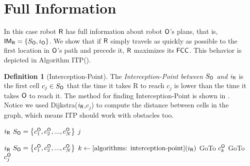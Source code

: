 \documentclass[letterpaper, 10 pt, conference]{ieeeconf}  %
\theoremstyle{definition}
\newtheorem{definition}{Definition}[section]
\newcommand{\rob}{{{\sf R}}\xspace}
\newcommand{\opp}{{{\sf O}}\xspace}
\newcommand{\fcc}{{{\sf{FCC}}}\xspace}
\newcommand{\IM}{{{\sf{IM}}}\xspace}
\newcommand{\itp}{{{\textsf{ITP}}}\xspace}
\begin{document}
\section{Full Information}
In this case robot $\rob$ has full information about robot $\opp$'s plans, that is, $\IM_{\rob}=\lbrace S_{\opp},i_{\opp}\rbrace$. We show that if $\rob$ simply travels as quickly as possible to the first location in $\opp$'s path and precede it, $\rob$  maximizes its $\fcc$. This behavior is depicted in Algorithm \itp (). 

\begin{definition}[Interception-Point]
The {\em Interception-Point between $S_{\opp}$ and $i_{\rob}$} is the first cell $c_j\in S_{\opp}$ that the time it takes \rob to reach $c_j$ is lower than the time it takes $\opp$ to reach it. 
The method for finding Interception-Point is shown in . 
Notice we used Dijkstra($i_\rob$,$c_j$)\cite{dijkstra1959note} to compute the distance between cells in the graph, which means \itp should work with obstacles too.
\end{definition}
\begin{algorithm}
    \begin{algorithmic}
        \REQUIRE $i_\rob$
        \REQUIRE  $S_{\opp}=\left\{c_1^{\opp},c_2^{\opp},...,c_N^{\opp}\right\}$
            \IF {Dijkstra $(i_\rob,c_j)$ $<j$}
                \RETURN $j$
            \ENDIF
        \ENDFOR
    \end{algorithmic}
\caption{Finding Interception-Point}\label{algorithms: interception-point}
\end{algorithm}

\begin{algorithm}
\begin{algorithmic}
    \REQUIRE $i_\rob$
    \REQUIRE $S_{\opp}=\left\{c_1^{\opp},c_2^{\opp},...,c_N^{\opp}\right\}$
	\STATE $k \leftarrow \Cref{algorithms: interception-point}(i_\rob)$
    \STATE GoTo $c^{\opp}_{k}$
        \STATE GoTo $c^{\opp}_j$
    \ENDFOR
\end{algorithmic}
\caption{Intercept Then Precede (\itp)\label{algorithms: Intercept-then-Precede}}
\end{algorithm}
\end{document}
